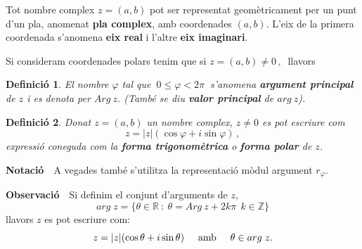 \documentclass[12pt]{article}
\newcommand{\notacio}{\textbf{Notaci{\'o}}\ \ }
\newcommand{\observacio}{\textbf{Observaci{\'o}}\ \ }
\newtheorem{definicio}{Definici{\'o}}[subsection]
\newcommand{\R}{\mathbb{R}}
\begin{document}
Tot nombre complex $z=(a,b)$ pot ser representat
geom{\`e}tricament per un punt d'un pla, anomenat \textbf{pla
complex}, amb coordenades $(a,b)$. L'eix de la primera
coordenada s'anomena \textbf{eix real} i l'altre \textbf{eix
imaginari}.

Si consideram coordenades polars tenim que si $z=(a,b)\neq
0\,,\ $ llavors

\vspace{0.4cm}



\begin{figure}[h!]
\begin{center}
\vspace{-.4cm}
\end{center}
\end{figure}


\vspace{0.4cm}
\begin{definicio}
El nombre $\varphi$ tal que $\ 0\leq\varphi<2\pi\ $ s'anomena
\textbf{argument principal} de $z$ i es denota per $Arg\ z$.
(Tamb\'{e} se diu \textbf{valor principal} de $arg\ z$).
\end{definicio}

\vspace{0.4cm}
\begin{definicio}
Donat $z=(a,b)$ un nombre complex, $z\neq 0$ es pot
escriure com
$$z=|z|(\cos\varphi+i\sin\varphi)\,,$$
expressi{\'o}
coneguda com la \textbf{forma trigonom{\`e}trica} o \textbf{forma
polar} de $z$.
\end{definicio}

\vspace{0.4cm}
\notacio  A vegades tamb{\'e} s'utilitza la representaci{\'o}
m{\`o}dul argument $r_{\varphi}$.


\vspace{0.4cm}
\observacio  Si definim el conjunt d'arguments de $z$,
$$arg\;z=\{\theta\in \R\ :\ \theta=Arg\ z+2k\pi\ \ k\in \mathbb{Z} \}$$
llavors $z$ es pot escriure com:
$$z=|z|(\cos\theta+i\sin\theta)\hspace{0.5cm} \textrm{amb}\hspace{0.5cm} \theta\in arg\;z.$$
\end{document}
